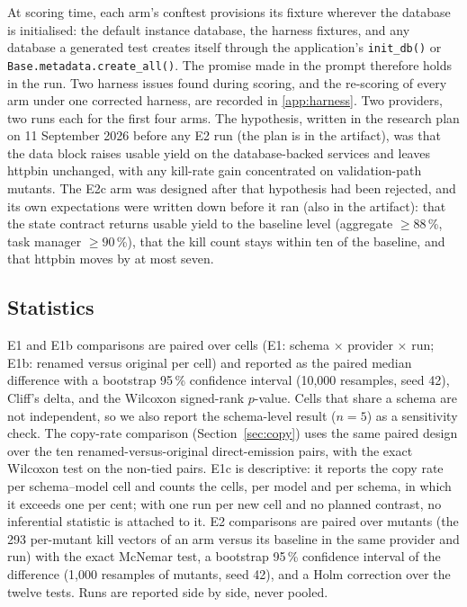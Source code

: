 \documentclass[preprint,12pt]{elsarticle}
\begin{document}
At scoring time, each arm's conftest provisions its fixture wherever the database is initialised: the default instance database, the harness fixtures, and any database a generated test creates itself through the application's \texttt{init\_db()} or \texttt{Base.metadata.create\_all()}. The promise made in the prompt therefore holds in the run. Two harness issues found during scoring, and the re-scoring of every arm under one corrected harness, are recorded in \ref{app:harness}. Two providers, two runs each for the first four arms. The hypothesis, written in the research plan on 11 September 2026 before any E2 run (the plan is in the artifact), was that the data block raises usable yield on the database-backed services and leaves httpbin unchanged, with any kill-rate gain concentrated on validation-path mutants. The E2c arm was designed after that hypothesis had been rejected, and its own expectations were written down before it ran (also in the artifact): that the state contract returns usable yield to the baseline level (aggregate $\ge 88$\,\%, task manager $\ge 90$\,\%), that the kill count stays within ten of the baseline, and that httpbin moves by at most seven.

\subsection{Statistics}
\label{sec:stats}
E1 and E1b comparisons are paired over cells (E1: schema $\times$ provider $\times$ run; E1b: renamed versus original per cell) and reported as the paired median difference with a bootstrap 95\,\% confidence interval (10,000 resamples, seed 42), Cliff's delta, and the Wilcoxon signed-rank $p$-value. Cells that share a schema are not independent, so we also report the schema-level result ($n=5$) as a sensitivity check. The copy-rate comparison (Section~\ref{sec:copy}) uses the same paired design over the ten renamed-versus-original direct-emission pairs, with the exact Wilcoxon test on the non-tied pairs. E1c is descriptive: it reports the copy rate per schema--model cell and counts the cells, per model and per schema, in which it exceeds one per cent; with one run per new cell and no planned contrast, no inferential statistic is attached to it. E2 comparisons are paired over mutants (the 293 per-mutant kill vectors of an arm versus its baseline in the same provider and run) with the exact McNemar test, a bootstrap 95\,\% confidence interval of the difference (1,000 resamples of mutants, seed 42), and a Holm correction over the twelve tests. Runs are reported side by side, never pooled.
\end{document}
